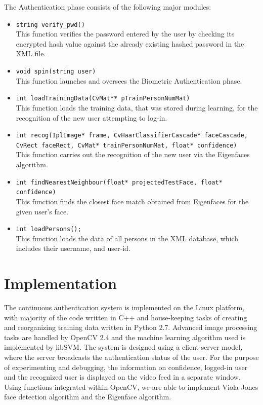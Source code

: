 \documentclass[12pt]{article}			%
\begin{document}
The Authentication phase consists of the following major modules:
\begin{itemize}

\item 
\verb+string verify_pwd()+\\
This function verifies the password entered by the user by checking its encrypted hash value against the already existing hashed password in the XML file.

\item 
\verb+void spin(string user)+\\
This function launches and oversees the Biometric Authentication phase.

\item 
\verb+int loadTrainingData(CvMat** pTrainPersonNumMat)+\\
This function loads the training data, that was stored during learning, for the recognition of the new user attempting to log-in.

\item 
\verb+int recog(IplImage* frame, CvHaarClassifierCascade* faceCascade, CvRect faceRect, CvMat* trainPersonNumMat, float* confidence)+\\
This function carries out the recognition of the new user via the Eigenfaces algorithm.

\item 
\verb+int findNearestNeighbour(float* projectedTestFace, float* confidence)+\\
This function finds the closest face match obtained from Eigenfaces for the given user's face.

\item 
\verb+int loadPersons();+\\
This function loads the data of all persons in the XML database, which includes their username, and user-id.

\end{itemize}


\newpage

\section{ Implementation }  
The continuous authentication system is implemented on the Linux platform, with majority of the code written in C++ and house-keeping tasks of creating and reorganizing training data written in Python 2.7.
Advanced image processing tasks are handled by OpenCV 2.4\cite{opencv} and the machine learning algorithm used is implemented by libSVM\cite{libsvm}.
The system is designed using a client-server model, where the server broadcasts the authentication status of the user.
For the purpose of experimenting and debugging, the information on confidence, logged-in user and the recognized user is displayed on the video feed in a separate window. Using functions integrated within OpenCV, we are able to implement Viola-Jones face detection algorithm and the Eigenface algorithm.
\end{document}
